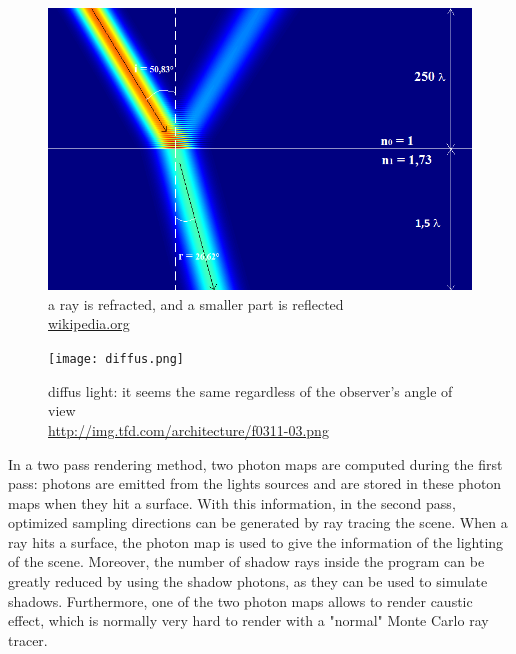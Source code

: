 \documentclass[12pt]{article}
\numberwithin{equation}{section}
\begin{document}
\begin{figure}
  \begin{center}
    \includegraphics[scale=0.3]{RefractionModelisation.png}
    \caption{a ray is refracted, and a smaller part is reflected\\\url{wikipedia.org}}
    \label{fig:2}
  \end{center}
\end{figure}

\begin{figure}
  \begin{center}
    \texttt{[image: diffus.png]}
    \caption{diffus light: it seems the same regardless of the observer's angle of view\\\url{http://img.tfd.com/architecture/f0311-03.png} }
    \label{fig:3}
  \end{center}
\end{figure}

In a two pass rendering method, two photon maps are computed during the first pass: photons are emitted from the lights sources and are stored in these photon maps when they hit a surface. With this information, in the second pass, optimized sampling directions can be generated by ray tracing the scene. When a ray hits a surface, the photon map is used to give the information of the lighting of the scene. Moreover, the number of shadow rays inside the program can be greatly reduced by using the shadow photons, as they can be used to simulate shadows. Furthermore, one of the two photon maps allows to render caustic effect, which is normally very hard to render with a "normal" Monte Carlo ray tracer.\\
\end{document}
